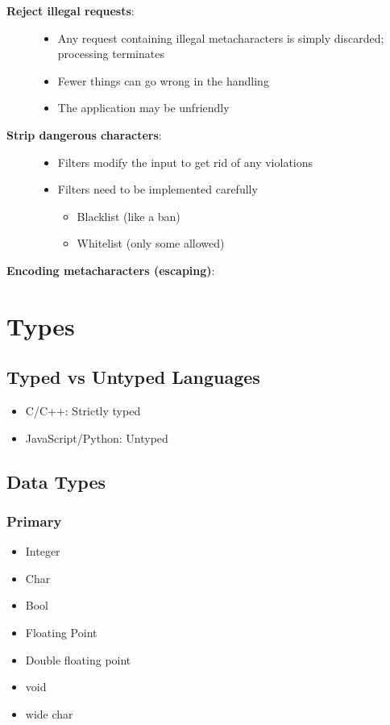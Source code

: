 \documentclass[11pt,a4paper]{article}
\begin{document}
\begin{description}
    \item[\textbf{Reject illegal requests}:]
    \begin{itemize}
        \item Any request containing illegal metacharacters is simply discarded; processing terminates
        \item Fewer things can go wrong in the handling
        \item The application may be unfriendly
    \end{itemize}
    
    \item[\textbf{Strip dangerous characters}:]
    \begin{itemize}
        \item Filters modify the input to get rid of any violations
        \item Filters need to be implemented carefully
        \begin{itemize}
            \item Blacklist (like a ban)
            \item Whitelist (only some allowed)
        \end{itemize}
    \end{itemize}
    
    \item[\textbf{Encoding metacharacters (escaping)}:]
\end{description}

\section{Types}

\subsection{Typed vs Untyped Languages}

\begin{itemize}
    \item C/C++: Strictly typed
    \item JavaScript/Python: Untyped
\end{itemize}

\subsection{Data Types}

\subsubsection{Primary}
\begin{itemize}
    \item Integer
    \item Char
    \item Bool
    \item Floating Point
    \item Double floating point
    \item void
    \item wide char
\end{itemize}
\end{document}
